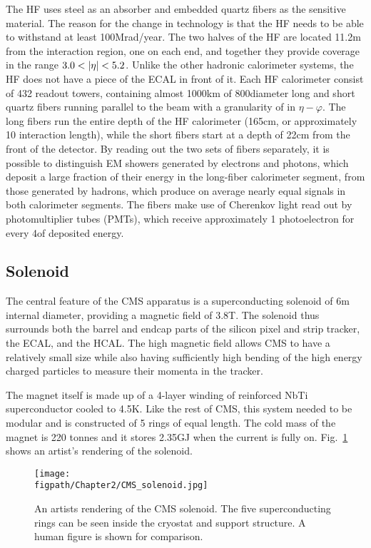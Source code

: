 The HF uses steel as an absorber and embedded quartz fibers as the sensitive material.
The reason for the change in technology is that the HF needs to be able to withstand at least 100\unit{Mrad/year}.
The two halves of the HF are located 11.2\unit{m} from the interaction region, one on each end, and together they provide coverage in the range $3.0<\lvert \eta \rvert<5.2$.
Unlike the other hadronic calorimeter systems, the HF does not have a piece of the ECAL in front of it.
Each HF calorimeter consist of 432 readout towers, containing almost 1000\unit{km} of 800\mum diameter long and short quartz fibers running parallel to the beam with a granularity of  in $\eta-\varphi$.
The long fibers run the entire depth of the HF calorimeter (165\unit{cm}, or approximately 10 interaction length), while the short fibers start at a depth of 22\unit{cm} from the front of the detector.
By reading out the two sets of fibers separately, it is possible to distinguish EM showers generated by electrons and photons, which deposit a large fraction of their energy in the long-fiber calorimeter segment, from those generated by hadrons, which produce on average nearly equal signals in both calorimeter segments.
The fibers make use of Cherenkov light read out by photomultiplier tubes (PMTs), which receive approximately 1 photoelectron for every 4\gev of deposited energy.

\subsection{Solenoid}

The central feature of the CMS apparatus is a superconducting solenoid of 6\unit{m} internal diameter, providing a magnetic field of 3.8\unit{T}.
The solenoid thus surrounds both the barrel and endcap parts of the silicon pixel and strip tracker, the ECAL, and the HCAL.
The high magnetic field allows CMS to have a relatively small size while also having sufficiently high bending of the high energy charged particles to measure their momenta in the tracker.

The magnet itself is made up of a 4-layer winding of reinforced NbTi superconductor cooled to 4.5\unit{K}.
Like the rest of CMS, this system needed to be modular and is constructed of 5 rings of equal length.
The cold mass of the magnet is 220 tonnes and it stores 2.35\unit{GJ} when the current is fully on.
Fig.~\ref{fig:CMS_solenoid} shows an artist's rendering of the solenoid.

\begin{figure}[!hbt]
	\centering
	\texttt{[image: \\figpath/Chapter2/CMS\_solenoid.jpg]}
	\caption{An artists rendering of the CMS solenoid. The five superconducting rings can be seen inside the cryostat and support structure. A human figure is shown for comparison.}
	\label{fig:CMS_solenoid}
\end{figure}

